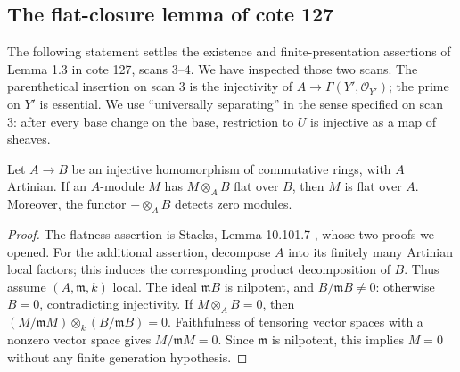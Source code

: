\subsection{The flat-closure lemma of cote 127}

The following statement settles the existence and finite-presentation assertions
of Lemma 1.3 in cote 127, scans 3--4.  We have inspected those two scans.
The parenthetical insertion on scan 3 is the injectivity of
$A\longrightarrow\Gamma(Y',\mathcal O_{Y'})$; the prime on $Y'$ is essential.
We use ``universally separating'' in the sense specified on scan 3: after every
base change on the base, restriction to $U$ is injective as a map of sheaves.

\begin{lemma}\label{A4:artinianflat}
Let $A\to B$ be an injective homomorphism of commutative rings, with $A$
Artinian.  If an $A$-module $M$ has $M\otimes_A B$ flat over $B$, then $M$
is flat over $A$.  Moreover, the functor $-\otimes_A B$ detects zero modules.
\end{lemma}
\begin{proof}
The flatness assertion is Stacks, Lemma 10.101.7
\cite[Tag 051E, Lemma 10.101.7]{StacksArtinian}, whose two proofs we opened.
For the additional assertion, decompose $A$ into its finitely many Artinian
local factors; this induces the corresponding product decomposition of $B$.
Thus assume $(A,\mathfrak m,k)$ local.  The ideal $\mathfrak mB$ is nilpotent,
and $B/\mathfrak mB\ne0$: otherwise $B=0$, contradicting injectivity.
If $M\otimes_A B=0$, then
$(M/\mathfrak mM)\otimes_k(B/\mathfrak mB)=0$.  Faithfulness of tensoring
vector spaces with a nonzero vector space gives $M/\mathfrak mM=0$.
Since $\mathfrak m$ is nilpotent, this implies $M=0$ without any finite
generation hypothesis.
\end{proof}

